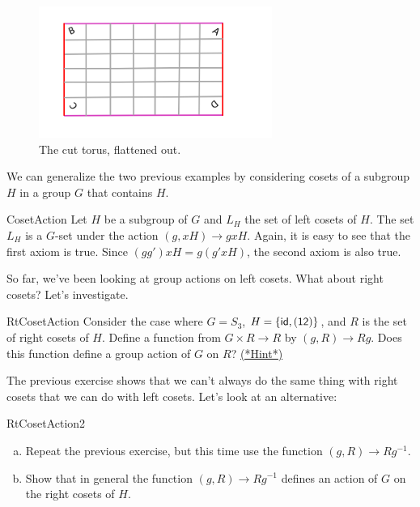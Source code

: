 \begin{figure}[ht]
\begin{center}
\includegraphics[width=3in]{images/Torus2.png}
\caption{The cut torus, flattened out.}\label{fig:Torus2}
\end{center}
\end{figure}

We can generalize the two previous examples by considering cosets of a subgroup $H$ in a group $G$ that contains $H$.

\begin{example}{CosetAction}
Let $H$ be a subgroup of $G$ and $L_H$ the set of left cosets of $H$. The set $L_H$ is a $G$-set under the action 
$(g,xH)\rightarrow gxH$.
Again, it is easy to see that the first axiom is true. Since $(gg')xH = g(g'xH)$, the second axiom is also true.
\end{example}
So far, we've been looking at group actions on left cosets.  What about right cosets?  Let's investigate.

\begin {exercise}{RtCosetAction}
Consider the case where $G=S_3$, $H=\{\sf{id},(12)\}$, and $R$ is the set of right cosets of $H$.  Define a function from $G\times R\rightarrow R$ by $(g,R)\rightarrow Rg$. Does this function define a group action of $G$ on $R$? 
\hyperref[sec:actions:hints]{(*Hint*)}
\end {exercise}
The previous exercise shows that we can't always do the same thing with right cosets that we can do with left cosets.  Let's look at an alternative:  

\begin {exercise}{RtCosetAction2}
\begin{enumerate}[(a)]
\item Repeat the previous exercise, but this time use the function $(g,R)\rightarrow Rg^{-1}$.
\item Show that in general the function $(g,R)\rightarrow Rg^{-1}$ defines an action of $G$ on the right cosets of $H$.  
\end {enumerate}
\end {exercise}
